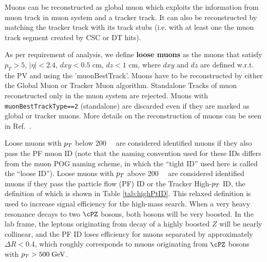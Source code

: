 Muons can be reconstructed as global muon which exploits the information from muon track in muon system and a tracker track.
It can also be reconstructed by matching the tracker track with its track stubs (i.e. with at least one the muon track segment created by CSC or DT hits).

As per requirement of analysis, we define {\bf loose muons} as the muons that satisfy  
$p_T > 5$, $|\eta| < 2.4$, $dxy< 0.5$ cm, $dz < 1$ cm, where $dxy$ and $dz$ are 
defined w.r.t. the PV and using the 'muonBestTrack'. Muons have to be 
reconstructed by either the Global Muon or Tracker Muon algorithm. Standalone 
Tracks of muon reconstructed only in the muon system are rejected.
Muons with \verb|muonBestTrackType==2| (standalone) are discarded even if they 
are marked as global or tracker muons.
More details on the reconstruction of muons can be seen in Ref.~\cite{AN-15-277}.


Loose muons with $p_T$ below 200~\GeV~ are considered identified muons if they 
also pass the PF muon ID (note that the naming 
convention used for these IDs differs from the muon POG naming scheme, in which
the ``tight ID'' used here is called the ``loose ID''). Loose muons with $p_T$ 
above 200~\GeV~ are considered identified muons if they pass the particle flow (PF) ID or the Tracker
High-$p_T$ ID, the definition of which is shown in Table \ref{tab:highPtID}.
This relaxed definition is used to increase signal efficiency for the high-mass
search. When a very heavy resonance decays to two $\cPZ$ bosons, both bosons
will be very boosted. In the lab frame, the leptons originating from decay of
a highly boosted $Z$ will be nearly collinear, and the PF ID loses 
efficiency for muons separated by approximately $\Delta R < 0.4$, which roughly 
corresponds to muons originating from $\cPZ$ bosons with $p_T > 500\hbox{$\;\hbox{\rm GeV}$}$.

